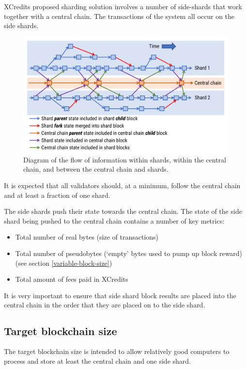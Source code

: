 \documentclass[a4paper,12pt]{article}
\begin{document}
XCredits proposed sharding solution involves a number of side-shards that work together with a central chain. The transactions of the system all occur on the side shards.

\begin{figure}[!htb]
  \centering
  \includegraphics[page=1,width=.95\textwidth]{shard-central-chain} 
  \caption{Diagram of the flow of information within shards, within the central chain, and between the central chain and shards.}
  \label{fig:shard-central-chain}
\end{figure}
\FloatBarrier

It is expected that all validators should, at a minimum, follow the central chain and at least a fraction of one shard. 

The side shards push their state towards the central chain. The state of the side shard being pushed to the central chain contains a number of key metrics:
\begin{itemize}
  \item Total number of real bytes (size of transactions)
  \item Total number of pseudobytes (`empty' bytes used to pump up block reward) (see section \ref{variable-block-size})
  \item Total amount of fees paid in XCredits
\end{itemize}

It is very important to ensure that side shard block results are placed into the central chain in the order that they are placed on to the side shard. 

\subsection{Target blockchain size}
The target blockchain size is intended to allow relatively good computers to process and store at least the central chain and one side shard. 
\end{document}
